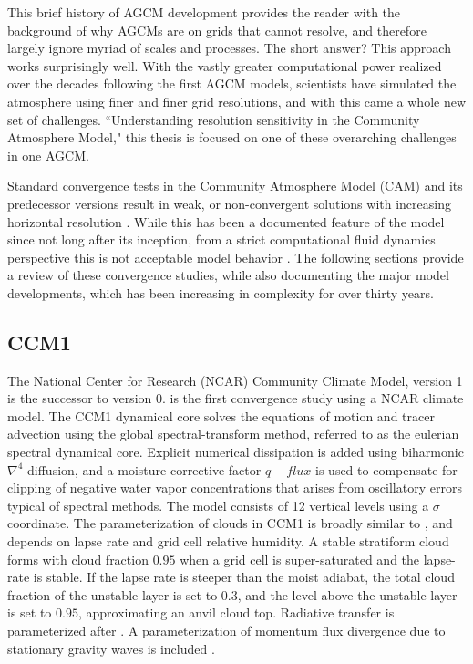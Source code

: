 This brief history of AGCM development provides the reader with the background of why AGCMs are on grids that cannot resolve, and therefore largely ignore myriad of scales and processes. The short answer? This approach works surprisingly well. With the vastly greater computational power realized over the decades following the first AGCM models, scientists have simulated the atmosphere using finer and finer grid resolutions, and with this came a whole new set of challenges. ``Understanding resolution sensitivity in the Community Atmosphere Model," this thesis is focused on one of these overarching challenges in one AGCM. 

Standard convergence tests in the Community Atmosphere Model (CAM) and its predecessor versions result in weak, or non-convergent solutions with increasing horizontal resolution \citep{KW1991JGR,WETAL1995CD,W1999T,W2008TELLUS,LETAL2011TELLUS,RJ2011MWR,RETAL2012ASL,OETAL2013JCLIM,RETAL2013JCLIM,ZetAl2014JCb,LETAL2015JCLIM}. While this has been a documented feature of the model since not long after its inception, from a strict computational fluid dynamics perspective this is not acceptable model behavior \citep{W2008TELLUS}. The following sections provide a review of these convergence studies, while also documenting the major model developments, which has been increasing in complexity for over thirty years.

\subsection{CCM1}

The National Center for Research (NCAR) Community Climate Model, version 1 \citep[CCM1;][]{CCM1} is the successor to version 0. \cite{KW1991JGR} is the first convergence study using a NCAR climate model. The CCM1 dynamical core solves the equations of motion and tracer advection using the global spectral-transform method, referred to as the eulerian spectral dynamical core. Explicit numerical dissipation is added using biharmonic $\nabla^{4}$ diffusion, and a moisture corrective factor $q-flux$ is used to compensate for clipping of negative water vapor concentrations that arises from oscillatory errors typical of spectral methods. The model consists of 12 vertical levels using a $\sigma$ coordinate. The parameterization of clouds in CCM1 is broadly similar to \cite{METAL1965MWR}, and depends on lapse rate and grid cell relative humidity. A stable stratiform cloud forms with cloud fraction $0.95$  when a grid cell is super-saturated and the lapse-rate is stable. If the lapse rate is steeper than the moist adiabat, the total cloud fraction of the unstable layer is set to $0.3$, and the level above the unstable layer is set to $0.95$, approximating an anvil cloud top. Radiative transfer is parameterized after \cite{CCM1RAD}. A parameterization of momentum flux divergence due to stationary gravity waves is included \citep{M1987JAS}. 

